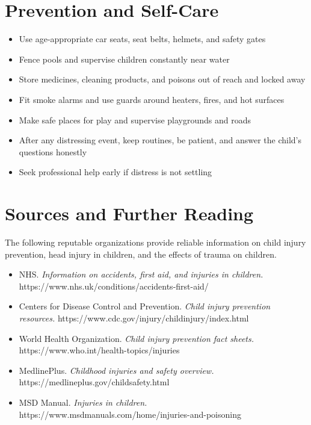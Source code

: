 \section*{Prevention and Self-Care}
\begin{itemize}
    \item Use age-appropriate car seats, seat belts, helmets, and safety gates
    \item Fence pools and supervise children constantly near water
    \item Store medicines, cleaning products, and poisons out of reach and locked away
    \item Fit smoke alarms and use guards around heaters, fires, and hot surfaces
    \item Make safe places for play and supervise playgrounds and roads
    \item After any distressing event, keep routines, be patient, and answer the child's questions honestly
    \item Seek professional help early if distress is not settling
\end{itemize}

\section*{Sources and Further Reading}
The following reputable organizations provide reliable information on child injury prevention, head injury in children, and the effects of trauma on children.
\begin{itemize}
    \item NHS. \textit{Information on accidents, first aid, and injuries in children.} https://www.nhs.uk/conditions/accidents-first-aid/
    \item Centers for Disease Control and Prevention. \textit{Child injury prevention resources.} https://www.cdc.gov/injury/childinjury/index.html
    \item World Health Organization. \textit{Child injury prevention fact sheets.} https://www.who.int/health-topics/injuries
    \item MedlinePlus. \textit{Childhood injuries and safety overview.} https://medlineplus.gov/childsafety.html
    \item MSD Manual. \textit{Injuries in children.} https://www.msdmanuals.com/home/injuries-and-poisoning
\end{itemize}
